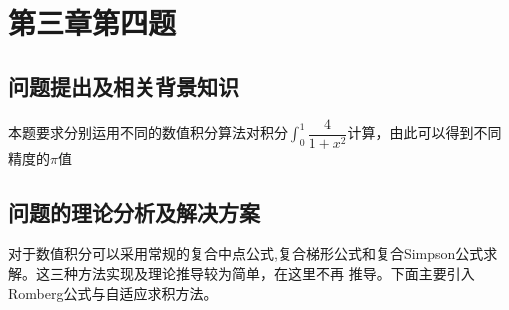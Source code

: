 \documentclass[10pt,a4paper]{ctexart}
\begin{document}
\section{第三章第四题}
\subsection{问题提出及相关背景知识}
本题要求分别运用不同的数值积分算法对积分$\int_{0}^{1}\dfrac{4}{1+x^2}$计算，由此可以得到不同精度的$\pi$值
\subsection{问题的理论分析及解决方案}
对于数值积分可以采用常规的复合中点公式,复合梯形公式和复合Simpson公式求解。这三种方法实现及理论推导较为简单，在这里不再
推导。下面主要引入Romberg公式与自适应求积方法。
\end{document}
